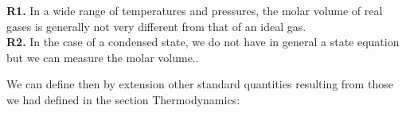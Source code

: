 	\begin{tcolorbox}[title=Remarks,arc=10pt,breakable,drop lifted shadow,
  skin=enhanced,
  skin first is subskin of={enhancedfirst}{arc=10pt,no shadow},
  skin middle is subskin of={enhancedmiddle}{arc=10pt,no shadow},
  skin last is subskin of={enhancedlast}{drop lifted shadow}]
	\textbf{R1.} In a wide range of temperatures and pressures, the molar volume of real gases is generally not very different from that of an ideal gas.\\
	
	\textbf{R2.} In the case of a condensed state, we do not have in general a state equation but we can measure the molar volume..
	\end{tcolorbox}
	We can define then by extension other standard quantities resulting from those we had defined in the section Thermodynamics:
